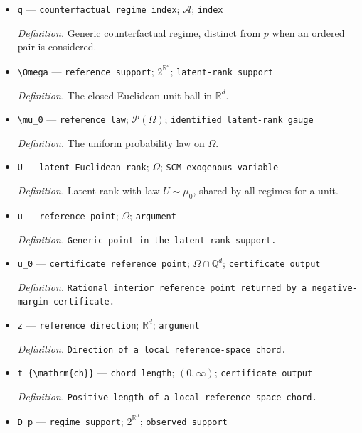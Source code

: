 \documentclass{article}
\begin{document}
\begin{itemize}
  \item \texttt{q} --- \texttt{counterfactual regime index}; \(\mathcal A\); \texttt{index}
  \par\smallskip\noindent\emph{Definition.} Generic counterfactual regime, distinct from \(p\) when an ordered pair is considered.
  \item \texttt{\textbackslash{}\allowbreak{}Omega} --- \texttt{reference support}; \(2^{\mathbb R^d}\); \texttt{latent-\allowbreak{}rank support}
  \par\smallskip\noindent\emph{Definition.} The closed Euclidean unit ball in \(\mathbb R^d\).
  \item \texttt{\textbackslash{}\allowbreak{}mu\_\allowbreak{}0} --- \texttt{reference law}; \(\mathcal P(\Omega)\); \texttt{identified latent-\allowbreak{}rank gauge}
  \par\smallskip\noindent\emph{Definition.} The uniform probability law on \(\Omega\).
  \item \texttt{U} --- \texttt{latent Euclidean rank}; \(\Omega\); \texttt{SCM exogenous variable}
  \par\smallskip\noindent\emph{Definition.} Latent rank with law \(U\sim\mu_0\), shared by all regimes for a unit.
  \item \texttt{u} --- \texttt{reference point}; \(\Omega\); \texttt{argument}
  \par\smallskip\noindent\emph{Definition.} \texttt{Generic point in the latent-\allowbreak{}rank support.}
  \item \texttt{u\_\allowbreak{}0} --- \texttt{certificate reference point}; \(\Omega\cap\mathbb Q^d\); \texttt{certificate output}
  \par\smallskip\noindent\emph{Definition.} \texttt{Rational interior reference point returned by a negative-\allowbreak{}margin certificate.}
  \item \texttt{z} --- \texttt{reference direction}; \(\mathbb R^d\); \texttt{argument}
  \par\smallskip\noindent\emph{Definition.} \texttt{Direction of a local reference-\allowbreak{}space chord.}
  \item \texttt{t\_\allowbreak{}\{\textbackslash{}\allowbreak{}mathrm\{ch\}\allowbreak{}\}\allowbreak{}} --- \texttt{chord length}; \((0,\infty)\); \texttt{certificate output}
  \par\smallskip\noindent\emph{Definition.} \texttt{Positive length of a local reference-\allowbreak{}space chord.}
  \item \texttt{D\_\allowbreak{}p} --- \texttt{regime support}; \(2^{\mathbb R^d}\); \texttt{observed support}

\end{itemize}
\end{document}

